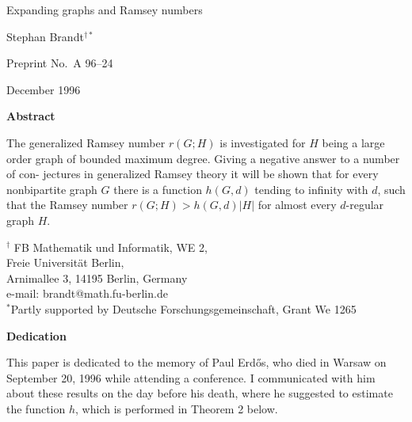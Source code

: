 \documentclass[12pt,a4paper]{article}
\begin{document}
\begin{titlepage}
\thispagestyle{empty}
\noindent{}

\vspace*{0.20\textheight}

\begin{center}
{\LARGE Expanding graphs and Ramsey numbers\par}
\vspace{1.2em}
{\large Stephan Brandt$^{\dagger *}$\par}
\vspace{2em}
{\Large Preprint No.\ A 96--24\par}
\vspace{0.3em}
{\Large December 1996\par}
\vfill
{\large\bfseries Abstract\par}
\vspace{0.8em}
\begin{minipage}{0.80\textwidth}
The generalized Ramsey number $r(G;H)$ is investigated for $H$ being a large order
graph of bounded maximum degree. Giving a negative answer to a number of con-
jectures in generalized Ramsey theory it will be shown that for every nonbipartite
graph $G$ there is a function $h(G,d)$ tending to infinity with $d$, such that the Ramsey
number $r(G;H)>h(G,d)|H|$ for almost every $d$-regular graph $H$.
\end{minipage}
\end{center}

\vfill

\noindent$^{\dagger}$ FB Mathematik und Informatik, WE 2,\\
Freie Universit\"at Berlin,\\
Arnimallee 3, 14195 Berlin, Germany\\
e-mail: brandt@math.fu-berlin.de\\
$^{*}$Partly supported by Deutsche Forschungsgemeinschaft, Grant We 1265
\end{titlepage}

\setcounter{page}{2}

\begin{center}
{\Large\bfseries Dedication}
\end{center}

This paper is dedicated to the memory of Paul Erd\H{o}s, who died in Warsaw on
September 20, 1996 while attending a conference. I communicated with him about
these results on the day before his death, where he suggested to estimate the function
$h$, which is performed in Theorem 2 below.
\end{document}
